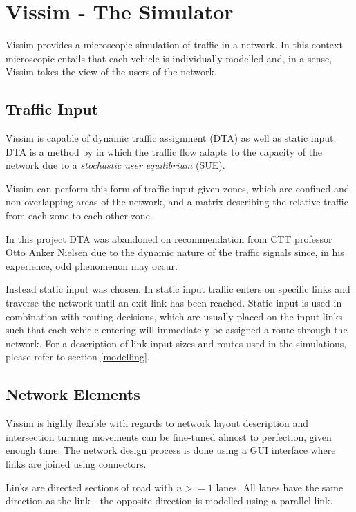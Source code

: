 \documentclass[10pt,a4paper]{article}
\begin{document}
\section{Vissim - The Simulator}
Vissim provides a microscopic simulation of traffic in a network. In this context microscopic entails that each vehicle is individually modelled and, in a sense, Vissim takes the view of the users of the network.

\subsection{Traffic Input}
Vissim is capable of dynamic traffic assignment (DTA) as well as static input. DTA is a method by \cite{Wardrop} in which the traffic flow adapts to the capacity of the network due to a \textit{stochastic user equilibrium} (SUE). 

Vissim can perform this form of traffic input given zones, which are confined and non-overlapping areas of the network, and a matrix describing the relative traffic from each zone to each other zone.

In this project DTA was abandoned on recommendation from CTT professor Otto Anker Nielsen due to the dynamic nature of the traffic signals since, in his experience, odd phenomenon may occur.

Instead static input was chosen. In static input traffic enters on specific links and traverse the network until an exit link has been reached. Static input is used in combination with routing decisions, which are usually placed on the input links such that each vehicle entering will immediately be assigned a route through the network. For a description of link input sizes and routes used in the simulations, please refer to section \ref{modelling}.

\subsection{Network Elements}

Vissim is highly flexible with regards to network layout description and intersection turning movements can be fine-tuned almost to perfection, given enough time. The network design process is done using a GUI interface where links are joined using connectors.

Links are directed sections of road with $n>=1$ lanes. All lanes have the same direction as the link - the opposite direction is modelled using a parallel link.
\end{document}

